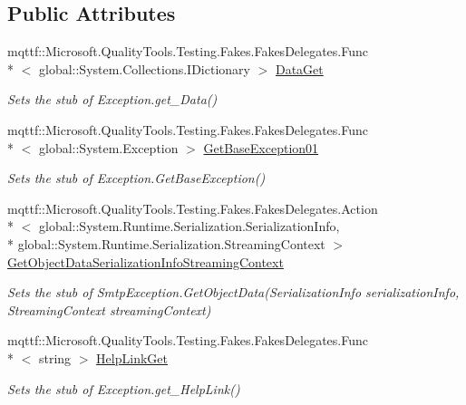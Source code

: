 \subsection*{Public Attributes}
\begin{DoxyCompactItemize}
\item 
mqttf\-::\-Microsoft.\-Quality\-Tools.\-Testing.\-Fakes.\-Fakes\-Delegates.\-Func\\*
$<$ global\-::\-System.\-Collections.\-I\-Dictionary $>$ \hyperlink{class_system_1_1_net_1_1_mail_1_1_fakes_1_1_stub_smtp_exception_a1f3b64a5459fc692016135d644a577c0}{Data\-Get}
\begin{DoxyCompactList}\small\item\em Sets the stub of Exception.\-get\-\_\-\-Data()\end{DoxyCompactList}\item 
mqttf\-::\-Microsoft.\-Quality\-Tools.\-Testing.\-Fakes.\-Fakes\-Delegates.\-Func\\*
$<$ global\-::\-System.\-Exception $>$ \hyperlink{class_system_1_1_net_1_1_mail_1_1_fakes_1_1_stub_smtp_exception_aa6e4d1d375c23c9096b2dfd36239941f}{Get\-Base\-Exception01}
\begin{DoxyCompactList}\small\item\em Sets the stub of Exception.\-Get\-Base\-Exception()\end{DoxyCompactList}\item 
mqttf\-::\-Microsoft.\-Quality\-Tools.\-Testing.\-Fakes.\-Fakes\-Delegates.\-Action\\*
$<$ global\-::\-System.\-Runtime.\-Serialization.\-Serialization\-Info, \\*
global\-::\-System.\-Runtime.\-Serialization.\-Streaming\-Context $>$ \hyperlink{class_system_1_1_net_1_1_mail_1_1_fakes_1_1_stub_smtp_exception_a5c6e0e765176879953eced5d3538cd5b}{Get\-Object\-Data\-Serialization\-Info\-Streaming\-Context}
\begin{DoxyCompactList}\small\item\em Sets the stub of Smtp\-Exception.\-Get\-Object\-Data(\-Serialization\-Info serialization\-Info, Streaming\-Context streaming\-Context)\end{DoxyCompactList}\item 
mqttf\-::\-Microsoft.\-Quality\-Tools.\-Testing.\-Fakes.\-Fakes\-Delegates.\-Func\\*
$<$ string $>$ \hyperlink{class_system_1_1_net_1_1_mail_1_1_fakes_1_1_stub_smtp_exception_ace9fc4cb5fbb24edbe2b7078a4298974}{Help\-Link\-Get}
\begin{DoxyCompactList}\small\item\em Sets the stub of Exception.\-get\-\_\-\-Help\-Link()\end{DoxyCompactList}\item 

\end{DoxyCompactItemize}
